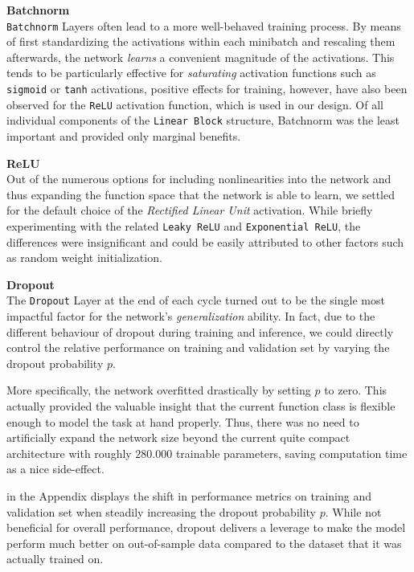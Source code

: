 \textbf{Batchnorm} \\
\texttt{Batchnorm} Layers \citep{ioffe2015} often lead to a more well-behaved training process.
By means of first standardizing the activations within each minibatch and rescaling them afterwards, the network \emph{learns} a convenient magnitude of the activations.
This tends to be particularly effective for \emph{saturating} activation functions such as \texttt{sigmoid} or \texttt{tanh} activations, positive effects for training, however, have also been observed for the \texttt{ReLU} activation function, which is used in our design.
Of all individual components of the \texttt{Linear Block} structure, Batchnorm was the least important and provided only marginal benefits.

\textbf{ReLU} \\
Out of the numerous options for including nonlinearities into the network and thus expanding the function space that the network is able to learn, we settled for the default choice of the \emph{Rectified Linear Unit} activation.
While briefly experimenting with the related \texttt{Leaky ReLU} and \texttt{Exponential ReLU}, the differences were insignificant and could be easily attributed to other factors such as random weight initialization.

\textbf{Dropout} \\ \label{dropout}
The \texttt{Dropout} Layer \citep{srivastava2014} at the end of each cycle turned out to be the single most impactful factor for the network's \emph{generalization} ability.
In fact, due to the different behaviour of dropout during training and inference, we could directly control the relative performance on training and validation set by varying the dropout probability $p$.

More specifically, the network overfitted drastically by setting $p$ to zero.
This actually provided the valuable insight that the current function class is flexible enough to model the task at hand properly.
Thus, there was no need to artificially expand the network size beyond the current quite compact architecture with roughly $280.000$ trainable parameters, saving computation time as a nice side-effect.

 in the Appendix displays the shift in performance metrics on training and validation set when steadily increasing the dropout probability $p$.
While not beneficial for overall performance, dropout delivers a leverage to make the model perform much better on out-of-sample data compared to the dataset that it was actually trained on.

